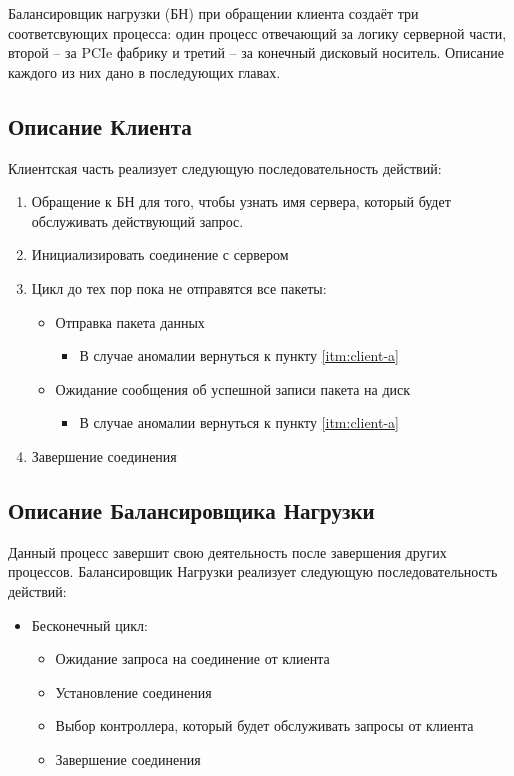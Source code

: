 Балансировщик нагрузки (БН) при обращении клиента создаёт три соответсвующих процесса: один процесс отвечающий за логику серверной части, второй -- за PCIe фабрику и третий -- за конечный дисковый носитель. Описание каждого из них дано в последующих главах.

\subsection{Описание Клиента}
Клиентская часть реализует следующую последовательность действий:

\begin{enumerate}
\item\label{itm:client-a} Обращение к БН для того, чтобы узнать имя сервера, который будет обслуживать действующий запрос. 
\item Инициализировать соединение с сервером 

\item Цикл до тех пор пока не отправятся все пакеты:
	\begin{itemize}
		\item Отправка пакета данных 
			\begin{itemize}
				\item В случае аномалии вернуться к пункту \ref{itm:client-a}
			\end{itemize}
		\item Ожидание сообщения об успешной записи пакета на диск
			\begin{itemize}
				\item В случае аномалии вернуться к пункту \ref{itm:client-a}
			\end{itemize}
	\end{itemize}
\item Завершение соединения
\end{enumerate}



\subsection{Описание Балансировщика Нагрузки}
Данный процесс завершит свою деятельность после завершения других процессов. Балансировщик Нагрузки реализует следующую последовательность действий: 

\begin{itemize}

\item Бесконечный цикл:
	\begin{itemize}
		\item Ожидание запроса на соединение от клиента
		\item Установление соединения
		\item Выбор контроллера, который будет обслуживать запросы от клиента
		\item  Завершение соединения
	\end{itemize}
\end{itemize}

